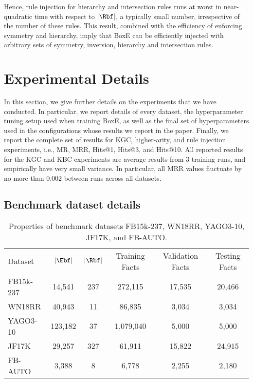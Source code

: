 \documentclass{article}
\begin{document}
Hence, rule injection for hierarchy and intersection rules runs at worst in near-quadratic time with respect to $|\Rbf|$, a typically small number, irrespective of the number of these rules. This result, combined with the efficiency of enforcing symmetry and hierarchy, imply that BoxE can be efficiently injected with arbitrary sets of symmetry, inversion, hierarchy and intersection rules.

\section{Experimental Details}
In this section, we give further details on the experiments that we have conducted. In particular, we report details of every dataset, the hyperparameter tuning setup used when training BoxE, as well as the final set of hyperparameters used in the configurations whose results we report in the paper. Finally, we report the complete set of results for KGC, higher-arity, and rule injection experiments, i.e., MR, MRR, Hits@1, Hits@3, and Hits@10. All reported results for the KGC and KBC experiments are average results from 3 training runs, and empirically have very small variance. In particular, all MRR values fluctuate by no more than $0.002$ between runs across all datasets. 

\label{app:exp}
\subsection{Benchmark dataset details}
\begin{table}[t!]
	\centering
	\caption{Properties of benchmark datasets FB15k-237, WN18RR, YAGO3-10, JF17K, and FB-AUTO.} 
	\begin{tabular}{lccccc}
		\toprule 
		 {Dataset} & $|\Ebf|$ & $|\Rbf|$ & Training Facts & Validation Facts & Testing Facts\\
		\cmidrule(r){2-6}
		 FB15k-237 & 14,541 & 237 & 272,115 & 17,535 & 20,466\\
		 WN18RR & 40,943 & 11 & 86,835 & 3,034 & 3,034 \\
		 YAGO3-10 & 123,182 & 37 & 1,079,040 & 5,000 & 5,000 \\
		 JF17K & 29,257 & 327 & 61,911 & 15,822 & 24,915 \\
		 FB-AUTO & 3,388 & 8 & 6,778 & 2,255 & 2,180 \\
		\bottomrule
	\end{tabular}
	\label{tab:DatasetDetails}
\end{table}
\end{document}
